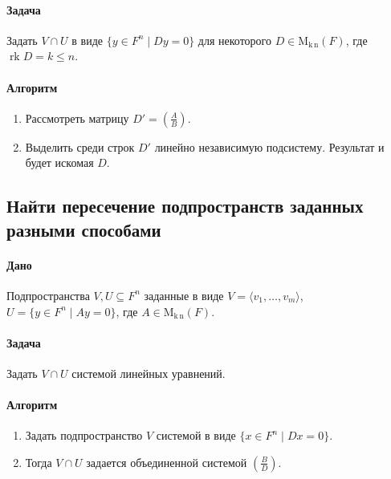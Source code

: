 \documentclass{article}
\newcommand{\MatrixDim}[3]{\operatorname{\mathrm{M}_{#2\,#3}}(#1)}
\newcommand{\rk}{\operatorname{rk}}
\begin{document}
\paragraph{Задача}

Задать $V\cap U$ в виде $\{y\in F^{n}\mid D y = 0\}$ для некоторого $D\in\MatrixDim{F}{k}{n}$, где $\rk D = k\leqslant n$.

\paragraph{Алгоритм}

\begin{enumerate}
\item Рассмотреть матрицу $D' = \left(\frac{A}{B}\right)$.

\item Выделить среди строк $D'$ линейно независимую подсистему.
Результат и будет искомая $D$.
\end{enumerate}


\subsection{Найти пересечение подпространств заданных разными способами}

\paragraph{Дано}

Подпространства $V,U\subseteq F^{n}$ заданные в виде $V =\langle v_1,\ldots,v_m\rangle$, $U = \{y\in F^{n}\mid Ay = 0\}$, где $A\in \MatrixDim{F}{k}{n}$.

\paragraph{Задача}

Задать $V \cap U$ системой линейных уравнений.

\paragraph{Алгоритм}

\begin{enumerate}
\item Задать подпространство $V$ системой в виде $\{x\in F^n \mid Dx = 0\}$.

\item Тогда $V\cap U$ задается объединенной системой $\left(\frac{B}{D}\right)$.
\end{enumerate}
\end{document}
